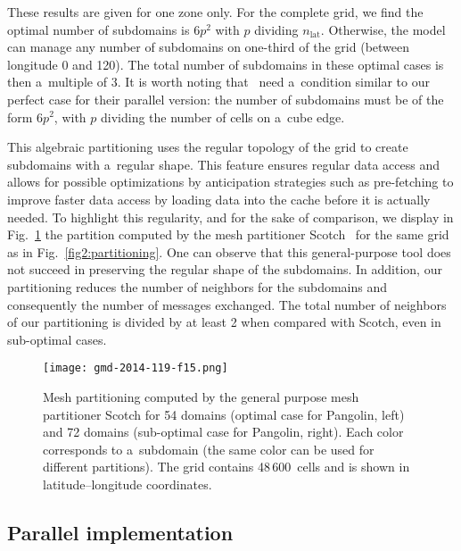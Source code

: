   These results are given for one zone only. For the complete grid,
   we find the optimal number of subdomains is $6p^2$ with $p$
   dividing $n_\mathrm{lat}$. Otherwise, the model can manage any number of
   subdomains on one-third of the grid (between longitude 0 and
   120). The total number of subdomains in these optimal cases is then
   a~multiple of 3.  It is worth noting that~\citet{White2011}
   need a~condition similar to our perfect case for their parallel
   version: the number of subdomains must be of the form $6p^2$, with
   $p$ dividing the number of cells on a~cube edge.

   This algebraic partitioning uses the regular topology of the grid to create
   subdomains with a~regular shape. This feature ensures regular data access and
   allows for possible optimizations by anticipation strategies such as
   pre-fetching to improve faster data access by loading data into the cache
   before it is actually needed. To highlight this regularity, and for the sake
   of comparison, we display in Fig.~\ref{fig2:scotch} the partition computed by
   the mesh partitioner Scotch~\citep{Pellegrini2012} for the same grid as in
   Fig.~\ref{fig2:partitioning}. One can observe that this general-purpose tool
   does not succeed in preserving the regular shape of the subdomains. In
   addition, our partitioning reduces the number of neighbors for the
   subdomains and consequently the number of messages exchanged. The total
   number of neighbors of our partitioning is divided by at least 2 when
   compared with Scotch, even in sub-optimal cases.

\begin{figure}[t]
  \centering
\texttt{[image: gmd-2014-119-f15.png]}
  \caption{Mesh partitioning computed by the general purpose mesh partitioner
    Scotch for 54 domains (optimal case for Pangolin, left) and 72 domains
    (sub-optimal case for Pangolin, right). Each color corresponds to a~subdomain
    (the same color can be used for different partitions). The grid contains
  48\,600~cells and is shown in latitude--longitude coordinates.  }
  \label{fig2:scotch}%
\end{figure}%


   \subsection{Parallel implementation}

